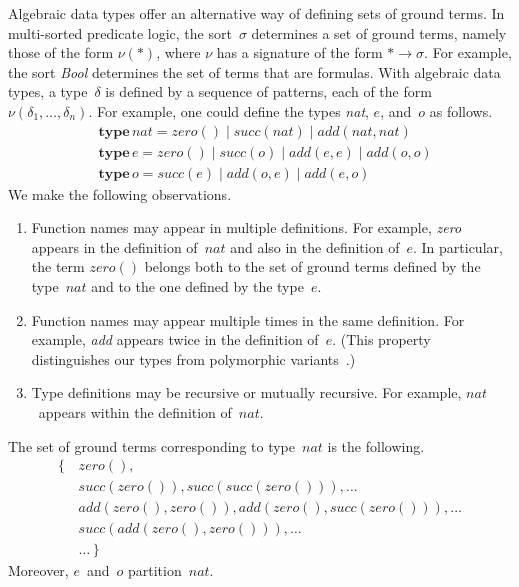 \documentclass[a4paper,12pt,oneside,fleqn]{book} %
\newcommand{\rg}[1]{\marginpar{\tiny\raggedright\textcolor{blue}{\bf rg:} #1}}
\renewcommand{\rg}{}
\begin{document}
Algebraic data types offer an alternative way of defining sets of ground
terms. In multi-sorted predicate logic, the sort~$\sigma$ determines a set
of ground terms, namely those of the form $\nu(*)$, where $\nu$ has a
signature of the form $*\to\sigma$.  For example, the sort \textit{Bool}
determines the set of terms that are formulas.  With algebraic data types,
a type~$\delta$ is defined by a sequence of patterns, each of the form
$\nu(\delta_1,\ldots,\delta_n)$. For example, one could define the types
\textit{nat}, $e$, and~$o$ as follows.
\begin{align}
&\mathbf{type}\,\mathit{nat} =
      \mathit{zero}()
  \mid\mathit{succ}(\mathit{nat})
  \mid\mathit{add}(\mathit{nat},\mathit{nat}) \\
&\mathbf{type}\,e =
      \mathit{zero}()
  \mid\mathit{succ}(o)
  \mid\mathit{add}(e,e)
  \mid\mathit{add}(o,o) \\
&\mathbf{type}\,o =
      \mathit{succ}(e)
  \mid\mathit{add}(o,e)
  \mid\mathit{add}(e,o)
\end{align}
We make the following observations.
\begin{enumerate}
\item
  Function names may appear in multiple definitions. For example,
  \textit{zero} appears in the definition of~$\mathit{nat}$ and also in the
  definition of~$e$. In particular, the term $\mathit{zero}()$ belongs both
  to the set of ground terms defined by the type~$\mathit{nat}$ and to the
  one defined by the type~$e$.
\item
  Function names may appear multiple times in the same definition. For
  example, \textit{add} appears twice in the definition of~$e$. (This
  property distinguishes our types from polymorphic
  variants~\cite{garrigue1998}.)
\item
  Type definitions may be recursive or mutually recursive. For example,
  $\mathit{nat}$~appears within the definition of~$\mathit{nat}$.
\end{enumerate}
The set of ground terms corresponding to type~$\mathit{nat}$ is the following.
\begin{equation}
\begin{aligned}
\{\,&\mathit{zero}(), \\
    &\mathit{succ}(\mathit{zero}()),
        \mathit{succ}(\mathit{succ}(\mathit{zero}())), \ldots \\
    &\mathit{add}(\mathit{zero}(), \mathit{zero}()),
        \mathit{add}(\mathit{zero}(), \mathit{succ}(\mathit{zero}())),
        \ldots \\
    &\mathit{succ}(\mathit{add}(\mathit{zero}(), \mathit{zero}())),
        \ldots \\
    &\ldots\, \}
\end{aligned}
\end{equation}
Moreover, $e$~and~$o$ partition~$\mathit{nat}$.
\end{document}
